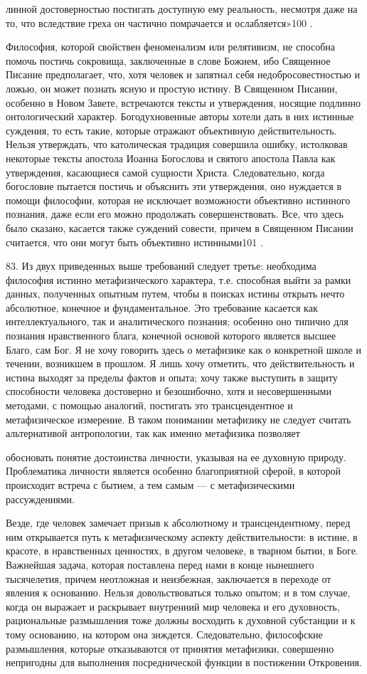 \documentclass[a5paper,10pt]{article}
\begin{document}
линной достоверностью постигать доступную ему реальность, несмотря даже на то,
что вследствие греха он частично помрачается и ослабляется»100 .

Философия, которой свойствен феноменализм или релятивизм, не способна помочь
постичь сокровища, заключенные в слове Божием, ибо Священное Писание
предполагает, что, хотя человек и запятнал себя недобросовестностью и ложью, он
может познать ясную и простую истину. В Священном Писании, особенно в Новом
Завете, встречаются тексты и утверждения, носящие подлинно онтологический
характер. Богодухновенные авторы хотели дать в них истинные суждения, то есть
такие, которые отражают объективную действительность. Нельзя утверждать, что
католическая традиция совершила ошибку, истолковав некоторые тексты апостола
Иоанна Богослова и святого апостола Павла как утверждения, касающиеся самой
сущности Христа. Следовательно, когда богословие пытается постичь и объяснить
эти утверждения, оно нуждается в помощи философии, которая не исключает
возможности объективно истинного познания, даже если его можно продолжать
совершенствовать. Все, что здесь было сказано, касается также суждений совести,
причем в Священном Писании считается, что они могут быть объективно
истинными101 .

83. Из двух приведенных выше требований следует третье: необходима философия
истинно метафизического характера, т.е. способная выйти за рамки данных,
полученных опытным путем, чтобы в поисках истины открыть нечто абсолютное,
конечное и фундаментальное. Это требование касается как интеллектуального, так
и аналитического познания; особенно оно типично для познания нравственного
блага, конечной основой которого является высшее Благо, сам Бог. Я не хочу
говорить здесь о метафизике как о конкретной школе и течении, возникшем в
прошлом. Я лишь хочу отметить, что действительность и истина выходят за пределы
фактов и опыта; хочу также выступить в защиту способности человека достоверно и
безошибочно, хотя и несовершенными методами, с помощью аналогий, постигать это
трансцендентное и метафизическое измерение. В таком понимании метафизику не
следует считать альтернативой антропологии, так как именно метафизика позволяет

обосновать понятие достоинства личности, указывая на ее духовную природу.
Проблематика личности является особенно благоприятной сферой, в которой
происходит встреча с бытием, а тем самым — с метафизическими рассуждениями.

Везде, где человек замечает призыв к абсолютному и трансцендентному, перед ним
открывается путь к метафизическому аспекту действительности: в истине, в
красоте, в нравственных ценностях, в другом человеке, в тварном бытии, в Боге.
Важнейшая задача, которая поставлена перед нами в конце нынешнего тысячелетия,
причем неотложная и неизбежная, заключается в переходе от явления к основанию.
Нельзя довольствоваться только опытом; и в том случае, когда он выражает и
раскрывает внутренний мир человека и его духовность, рациональные размышления
тоже должны восходить к духовной субстанции и к тому основанию, на котором она
зиждется. Следовательно, философские размышления, которые отказываются от
принятия метафизики, совершенно непригодны для выполнения посреднической
функции в постижении Откровения.
\end{document}
